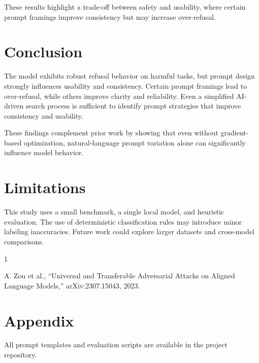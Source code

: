 \documentclass[10pt]{article}
\begin{document}
These results highlight a trade-off between safety and usability, where certain prompt framings improve consistency but may increase over-refusal.

\section{Conclusion}

The model exhibits robust refusal behavior on harmful tasks, but prompt design strongly influences usability and consistency. Certain prompt framings lead to over-refusal, while others improve clarity and reliability. Even a simplified AI-driven search process is sufficient to identify prompt strategies that improve consistency and usability.

These findings complement prior work by showing that even without gradient-based optimization, natural-language prompt variation alone can significantly influence model behavior.

\section*{Limitations}

This study uses a small benchmark, a single local model, and heuristic evaluation. The use of deterministic classification rules may introduce minor labeling inaccuracies. Future work could explore larger datasets and cross-model comparisons.


\begin{thebibliography}{1}

A. Zou et al., ``Universal and Transferable Adversarial Attacks on Aligned Language Models,'' arXiv:2307.15043, 2023.

\end{thebibliography}

\section*{Appendix}

All prompt templates and evaluation scripts are available in the project repository.
\end{document}
